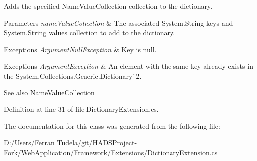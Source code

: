 Adds the specified {\ttfamily Name\+Value\+Collection} collection to the dictionary. 


\begin{DoxyParams}{Parameters}
{\em name\+Value\+Collection} & The associated {\ttfamily System.\+String} keys and {\ttfamily System.\+String} values collection to add to the dictionary. \\
\hline
\end{DoxyParams}



\begin{DoxyExceptions}{Exceptions}
{\em Argument\+Null\+Exception} & Key is null. \\
\hline
\end{DoxyExceptions}



\begin{DoxyExceptions}{Exceptions}
{\em Argument\+Exception} & An element with the same key already exists in the {\ttfamily System.\+Collections.\+Generic.\+Dictionary\`{}2}. \\
\hline
\end{DoxyExceptions}


\begin{DoxySeeAlso}{See also}
Name\+Value\+Collection


\end{DoxySeeAlso}


Definition at line 31 of file Dictionary\+Extension.\+cs.



The documentation for this class was generated from the following file\+:\begin{DoxyCompactItemize}
\item 
D\+:/\+Users/\+Ferran Tudela/git/\+H\+A\+D\+S\+Project-\/\+Fork/\+Web\+Application/\+Framework/\+Extensions/\mbox{\hyperlink{DictionaryExtension_8cs}{Dictionary\+Extension.\+cs}}\end{DoxyCompactItemize}
